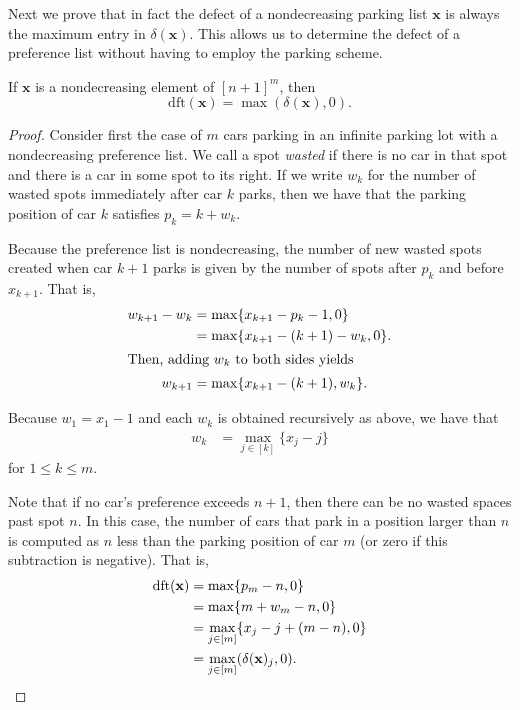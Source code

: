 \documentclass[11pt,reqno]{BICA}
\theoremstyle{definition}
\newcommand{\x}{\mathbf{x}}
\newcommand{\de}{\mathrm{dft}}
\begin{document}
Next we prove that in fact the defect of a nondecreasing parking list $\x$ is always the maximum entry in $\delta(\x)$. This allows us to determine the defect of a  preference list without having to employ the parking scheme. 

\begin{lemma}\label{prop:defect2}
If $\x$ is a nondecreasing element of $[n+1]^m$, then 
\[\de(\x)=\max(\delta(\x),0).\]
\end{lemma}

\begin{proof}
    Consider first the case of $m$ cars parking in an infinite parking lot with a nondecreasing preference list. We call a spot \emph{wasted} if there is no car in that spot and there is a car in some spot to its right. If we write $w_k$ for the number of wasted spots immediately after car $k$ parks, then we have that the parking position of car $k$ satisfies $p_k=k+w_k$.

    Because the preference list is nondecreasing, the number of new wasted spots created when car $k+1$ parks is given by the number of spots after $p_k$ and before $x_{k+1}$. That is, \begin{align*}
        w_{k+1}-w_k&=\max\{x_{k+1}-p_k-1,0\}\\
        &=\max\{x_{k+1}-(k+1)-w_k,0\}.\\
        \intertext{Then, adding $w_k$ to both sides yields}
        w_{k+1}&=\max\{x_{k+1}-(k+1),w_k\}.
    \end{align*}

    Because $w_1=x_1-1$ and each $w_k$ is obtained recursively as above, we have that \begin{align*}
        w_k&=\max_{j\in[k]}\{x_j-j\}
    \end{align*} for $1\leq k\leq m$.

    Note that if no car's preference exceeds $n+1$, then there can be no wasted spaces past spot $n$. In this case, the number of cars that park in a position larger than $n$ is computed as $n$ less than the parking position of car $m$ (or zero if this subtraction is negative). That is, \begin{align*}
        \de(\x)&=\max\{p_m-n,0\}\\
        &=\max\{m+w_m-n,0\}\\
        &=\max_{j\in[m]}\{x_j-j+(m-n),0\}\\
        &=\max_{j\in[m]}(\delta(\x)_j,0).\qedhere
    \end{align*}
\end{proof}
\end{document}
